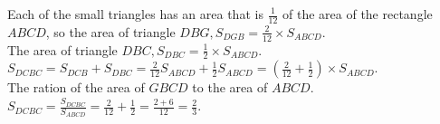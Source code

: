 \documentclass{article}
\begin{document}
Each of the small triangles has an area that is \(\frac{1}{12}\) of the area of the rectangle \(A B C D\), so the area of triangle \(D B G, S_{D G B}=\frac{2}{12} \times S_{A B C D}\).\\
The area of triangle \(D B C, S_{D B C}=\frac{1}{2} \times S_{A B C D}\).\\
\(S_{D C B C}=S_{D C B}+S_{D B C}=\frac{2}{12} S_{A B C D}+\frac{1}{2} S_{A B C D}=\left(\frac{2}{12}+\frac{1}{2}\right) \times S_{A B C D}\).\\
The ration of the area of \(G B C D\) to the area of \(A B C D\).\\
\(S_{D C B C}=\frac{S_{D C B C}}{S_{A B C D}}=\frac{2}{12}+\frac{1}{2}=\frac{2+6}{12}=\frac{2}{3}\).
\end{document}
